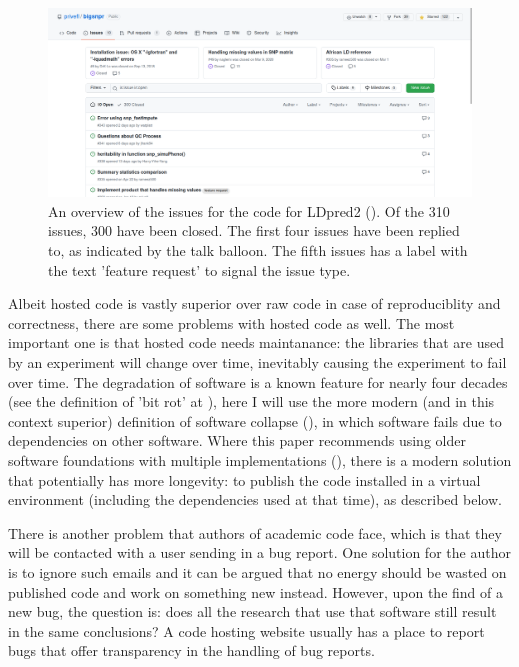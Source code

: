 \begin{figure}[!htbp]
  \centering
  \includegraphics[width=\linewidth]{issue_ldpred2.png}
  \caption{
    An overview of the issues for the code for
    LDpred2 (\cite{prive2020ldpred2}). Of the 310 issues, 300 have been closed.
    The first four issues have been replied to, as indicated by the
    talk balloon. The fifth issues has a label with the text 'feature request'
    to signal the issue type.
  }
  \label{fig:issue_ldpred2}
\end{figure}


Albeit hosted code is vastly superior over raw code
in case of reproduciblity and correctness,
there are some problems with hosted code as well.
The most important one is that hosted code needs maintanance:
the libraries that are used by an experiment
will change over time, inevitably causing the experiment to fail
over time. 
The degradation of software is a known feature for nearly 
four decades (see the definition of 'bit rot' at \cite{steele1983hacker}),
here I will use the more modern (and in this context superior)
definition of software collapse (\cite{hinsen2019dealing}),
in which software fails due to dependencies on other 
software.
Where this paper recommends using older software foundations 
with multiple implementations (\cite{hinsen2019dealing}),
there is a modern solution that potentially has more longevity:
to publish the code installed in a virtual environment
(including the dependencies used at that time), as described below.

There is another problem that authors of academic code face,
which is that they will be contacted with a user sending in a bug report.
One solution for the author is to ignore such emails
and it can be argued that no energy should be wasted on published code
and work on something new instead.
However, upon the find of a new bug, the question is:
does all the research that use that software still 
result in the same conclusions?
A code hosting website usually has a place to report bugs
that offer transparency in the handling of bug reports.


